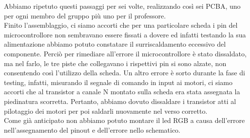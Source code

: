 \noindent Abbiamo ripetuto questi passaggi per sei volte, realizzando così sei PCBA, uno per ogni membro del gruppo più uno per il professore.\\
Finito l’assemblaggio, ci siamo accorti che per una particolare scheda i pin del microcontrollore non sembravano 
essere fissati a dovere ed infatti testando la sua alimentazione abbiamo potuto constatare il surriscaldamento eccessivo 
del componente. Perciò per rimediare all’errore il microcontrollore è stato dissaldato, ma nel farlo, le tre piste che collegavano 
i rispettivi pin si sono alzate, non consentendo così l’utilizzo della scheda. Un altro errore è sorto durante la fase di testing, 
infatti, misurando il segnale di comando in input ai motori, ci siamo accorti che al transistor a canale N montato sulla scheda era 
stata assegnata la piedinatura scorretta. Pertanto, abbiamo dovuto dissaldare i transistor atti al pilotaggio dei motori per poi 
saldarli nuovamente nel verso corretto.\\
Come già anticipato non abbiamo potuto montare il led RGB a causa dell'errore nell'assegnamento del pinout e dell'errore nello schematico.